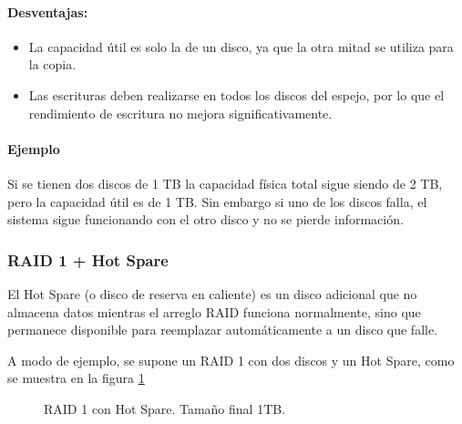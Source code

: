 \paragraph{Desventajas:}
\begin{itemize}
  \item La capacidad útil es solo la de un disco, ya que la otra mitad se utiliza para la copia.
  \item Las escrituras deben realizarse en todos los discos del espejo, por lo que el rendimiento de escritura no mejora significativamente.
\end{itemize}

\paragraph{Ejemplo}
Si se tienen dos discos de 1 TB la capacidad física total sigue siendo de 2 TB, pero la capacidad útil es de 1 TB. Sin embargo si uno de los discos falla, el sistema sigue funcionando con el otro disco y no se pierde información.

\subsubsection{RAID 1 + Hot Spare}

El Hot Spare (o disco de reserva en caliente) es un disco adicional que no almacena datos mientras el arreglo RAID funciona normalmente, sino que permanece disponible para reemplazar automáticamente a un disco que falle.

A modo de ejemplo, se supone un RAID 1 con dos discos y un Hot Spare, como se muestra en la figura \ref{fig:raid1spare}

\begin{figure}[!ht]
  \centering
  \caption{RAID 1 con Hot Spare. Tamaño final 1TB.}
  \label{fig:raid1spare}
\end{figure}

